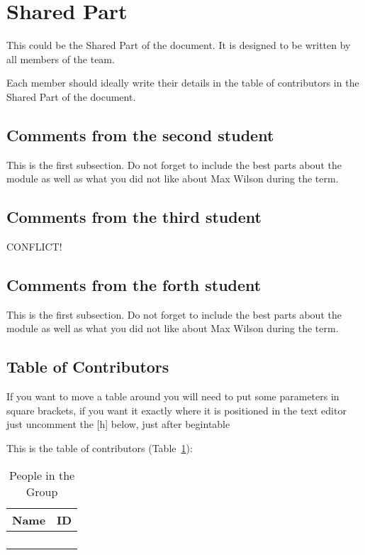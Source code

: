 \section{Shared Part}

This could be the Shared Part of the document. It is designed to be written by all members of the team.

Each member should ideally write their details in the table of contributors in the Shared Part of the document.



\subsection{Comments from the second student}
This is the first subsection. Do not forget to include the best parts about the module as well as what you did not like about Max Wilson during the term.

\subsection{Comments from the third student}
CONFLICT!

\subsection{Comments from the forth student}
This is the first subsection. Do not forget to include the best parts about the module as well as what you did not like about Max Wilson during the term.

\subsection{Table of Contributors}


If you want to move a table around you will need to put some parameters in square brackets, if you want it exactly where it is positioned in the text editor just uncomment the [h] below, just after begin{table}

This is the table of contributors (Table~\ref{authors}):
\begin{table}%
\centering
\caption{People in the Group}
\label{authors}
\begin{tabular}{|l|l|}
\hline
\textbf{Name} & \textbf{ID} \\
\hline
& \\
\hline
& \\
\hline
& \\
\hline
& \\
\hline
\end{tabular}
\end{table}
